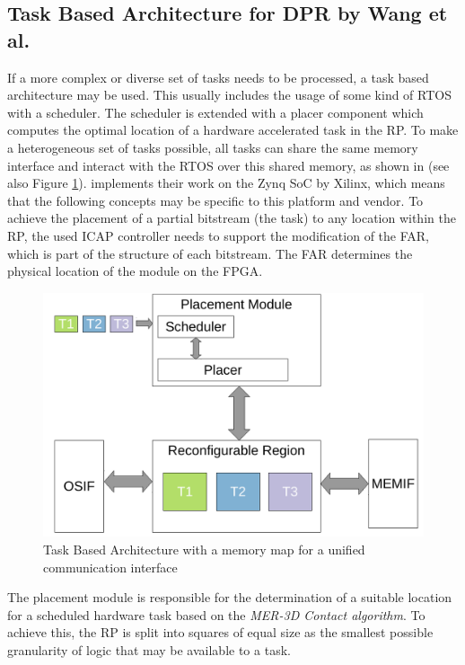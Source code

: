 \subsection{Task Based Architecture for \gls{DPR} by Wang et al.}\label{sec:TaskBasedArchitectureWang}
If a more complex or diverse set of tasks needs to be processed, a task based architecture may be used. 
This usually includes the usage of some kind of \gls{RTOS} with a scheduler.
The scheduler is extended with a placer component which computes the optimal location of a hardware accelerated task in the \gls{RP}.
To make a heterogeneous set of tasks possible, all tasks can share the same memory interface and interact with the \gls{RTOS} over this shared memory, as shown in \cite{wang_dynamic_2018} (see also Figure \ref{fig:TaskBased}).
\cite{wang_dynamic_2018} implements their work on the Zynq \gls{SoC} by Xilinx, which means that the following concepts may be specific to this platform and vendor. 
To achieve the placement of a partial bitstream (the task) to any location within the \gls{RP}, the used \gls{ICAP} controller needs to support the modification of the \gls{FAR}, which is part of the structure of each bitstream.
The \gls{FAR} determines the physical location of the module on the \gls{FPGA}.
\begin{figure}
    \centering
    \includegraphics[width=\columnwidth]{graphics/TaskBased.pdf}
    \caption{Task Based Architecture with a memory map for a unified communication interface}\label{fig:TaskBased}
\end{figure}
The placement module is responsible for the determination of a suitable location for a scheduled hardware task based on the \textit{MER-3D Contact algorithm}. 
To achieve this, the \gls{RP} is split into squares of equal size as the smallest possible granularity of logic that may be available to a task.
